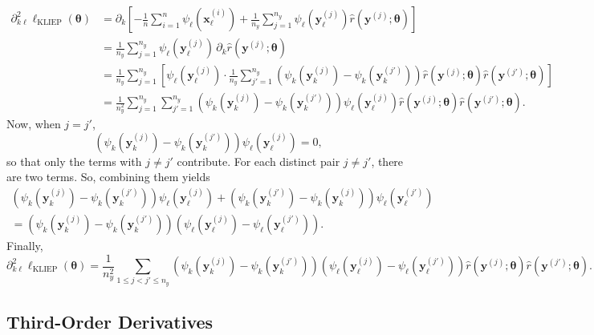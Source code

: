 \documentclass[11pt]{article}
\numberwithin{equation}{section}
\numberwithin{theorem}{section}
\def\fatx{\boldsymbol{x}}
\def\faty{\boldsymbol{y}}
\def\fattheta{\boldsymbol{\theta}}
\theoremstyle{definition}
\theoremstyle{remark}
\begin{document}
\begin{equation}
\begin{aligned}
\partial^2_{k\ell} \ell_\text{KLIEP}(\fattheta)
&= \partial_k \left[ -\frac{1}{n} \sum_{i=1}^{n} \psi_\ell(\fatx_\ell^{(i)}) + \frac{1}{n_y} \sum_{j=1}^{n_y} \psi_\ell(\faty_\ell^{(j)}) \hat r(\faty^{(j)};\fattheta) \right] \\
&= \frac{1}{n_y} \sum_{j=1}^{n_y} \psi_\ell(\faty_\ell^{(j)}) \, \partial_k \hat r(\faty^{(j)};\fattheta) \\
&= \frac{1}{n_y}\sum_{j=1}^{n_y} \left[ \psi_\ell(\faty_\ell^{(j)}) \cdot \frac{1}{n_y} \sum_{j'=1}^{n_y} \left( \psi_k(\faty_k^{(j)}) - \psi_k(\faty_k^{(j')}) \right) \hat r(\faty^{(j)};\fattheta) \hat r(\faty^{(j')}; \fattheta) \right] \\
&= \frac{1}{n_y^2} \sum_{j=1}^{n_y} \sum_{j'=1}^{n_y} \left( \psi_k(\faty_k^{(j)}) - \psi_k(\faty_k^{(j')}) \right)\psi_\ell(\faty_\ell^{(j)}) \hat r(\faty^{(j)};\fattheta) \hat r(\faty^{(j')};\fattheta).
\end{aligned}
\end{equation}
Now, when $j=j'$,
\begin{equation}
\left( \psi_k(\faty_k^{(j)}) - \psi_k(\faty_k^{(j')}) \right) \psi_\ell(\faty_\ell^{(j)}) = 0,
\end{equation}
so that only the terms with $j \neq j'$ contribute.
For each distinct pair $j \neq j'$, there are two terms.
So, combining them yields
\begin{multline}
\left( \psi_k(\faty_k^{(j)}) - \psi_k(\faty_k^{(j')}) \right) \psi_\ell(\faty_\ell^{(j)}) + \left( \psi_k(\faty_k^{(j')}) - \psi_k(\faty_k^{(j)}) \right) \psi_\ell(\faty_\ell^{(j')}) \\
= \left( \psi_k(\faty_k^{(j)}) - \psi_k(\faty_k^{(j')}) \right) \left( \psi_\ell(\faty_\ell^{(j)}) - \psi_\ell(\faty_\ell^{(j')}) \right).
\end{multline}
Finally,
\begin{equation} \label{eq:HlKLIEP}
\partial^2_{k\ell} \ell_\text{KLIEP}(\fattheta)
= \frac{1}{n_y^2} \sum_{1 \leq j < j' \leq n_y} \left( \psi_k(\faty_k^{(j)}) - \psi_k(\faty_k^{(j')}) \right)\left( \psi_\ell(\faty_\ell^{(j)}) - \psi_\ell(\faty_\ell^{(j')}) \right) \hat r(\faty^{(j)};\fattheta) \hat r(\faty^{(j')};\fattheta).
\end{equation}

\subsection{Third-Order Derivatives} \label{app:3rdlKLIEP}
\end{document}
